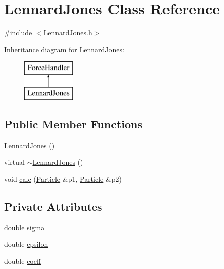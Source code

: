 \hypertarget{classLennardJones}{\section{Lennard\+Jones Class Reference}
\label{classLennardJones}
}


{\ttfamily \#include $<$Lennard\+Jones.\+h$>$}

Inheritance diagram for Lennard\+Jones\+:\begin{figure}[H]
\begin{center}
\leavevmode
\includegraphics[height=2.000000cm]{classLennardJones}
\end{center}
\end{figure}
\subsection*{Public Member Functions}
\begin{DoxyCompactItemize}
\item 
\hyperlink{classLennardJones_a80a661408c0326ee29438b80059468c3}{Lennard\+Jones} ()
\item 
virtual \hyperlink{classLennardJones_a5f748761b13b3bbdbe6ba1382b768b51}{$\sim$\+Lennard\+Jones} ()
\item 
void \hyperlink{classLennardJones_afea581125d54b69b58c41382314fd95e}{calc} (\hyperlink{classParticle}{Particle} \&p1, \hyperlink{classParticle}{Particle} \&p2)
\end{DoxyCompactItemize}
\subsection*{Private Attributes}
\begin{DoxyCompactItemize}
\item 
double \hyperlink{classLennardJones_a2101a01b7e63f01fab2c535bcfe08a74}{sigma}
\item 
double \hyperlink{classLennardJones_aff900d31ba58d734ed32b03e004dcf03}{epsilon}
\item 
double \hyperlink{classLennardJones_a23c80acc9a392671175565025e03b2e2}{coeff}
\end{DoxyCompactItemize}


